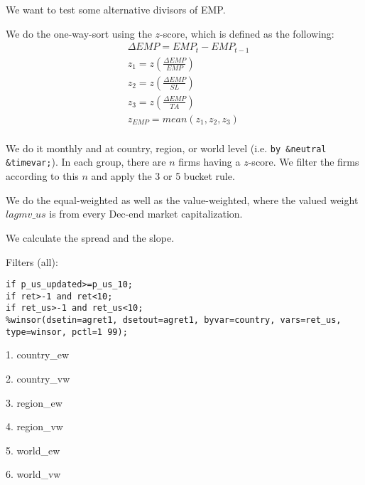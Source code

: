 

\usepackage[T1]{fontenc}




\thispagestyle{fancy}

\newcommand{\code}{\texttt}
\newcommand*{\Commonpath}{20181220/mean2}

We want to test some alternative divisors of EMP. 

We do the one-way-sort using the $z$-score, which is defined as the following:
$$
\begin{aligned}
& \Delta EMP = EMP_t - EMP_{t-1} \\
& z_1 = z(\frac{\Delta EMP}{EMP}) \\
& z_2 = z(\frac{\Delta EMP}{SL}) \\
& z_3 = z(\frac{\Delta EMP}{TA}) \\
& z_{EMP} = mean(z_1, z_2, z_3) \\
\end{aligned}
$$

We do it monthly and at country, region, or world level (i.e. \code{by \&neutral \&timevar;}). In each group, there are $n$ firms having a $z$-score. We filter the firms according to this $n$ and apply the 3 or 5 bucket rule.

We do the equal-weighted as well as the value-weighted, where the valued weight $lagmv\_us$ is from every Dec-end market capitalization.

We calculate the spread and the slope.

Filters (all):

\code{if p\_us\_updated>=p\_us\_10;} \\
\code{if ret>-1 and ret<10;} \\
\code{if ret\_us>-1 and ret\_us<10;} \\
\code{\%winsor(dsetin=agret1, dsetout=agret1, byvar=country, vars=ret\_us, type=winsor, pctl=1 99);}

1. country\_ew


2. country\_vw


3. region\_ew


4. region\_vw


5. world\_ew


6. world\_vw



